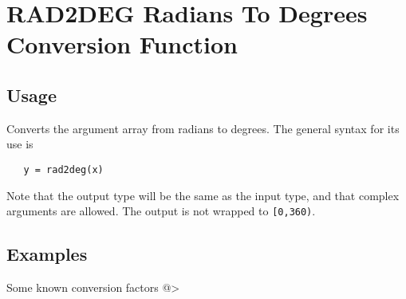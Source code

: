 \section{RAD2DEG Radians To Degrees Conversion Function}

\subsection{Usage}

Converts the argument array from radians to degrees.  The general
syntax for its use is
\begin{verbatim}
   y = rad2deg(x)
\end{verbatim}
Note that the output type will be the same as the input type, and that
complex arguments are allowed.  The output is not wrapped to \verb|[0,360)|.
\subsection{Examples}

Some known conversion factors
@>
